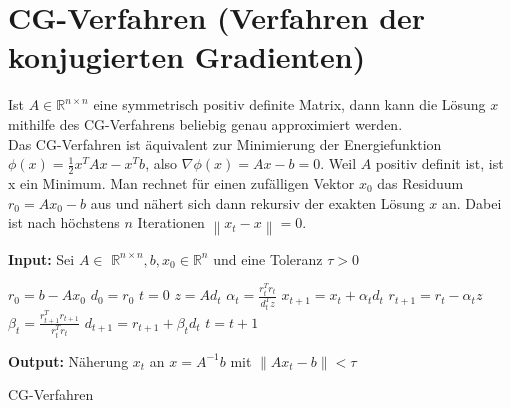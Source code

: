 \documentclass[12pt,a4paper]{scrartcl}
\numberwithin{equation}{section}
\numberwithin{myalgctr}{section}
\numberwithin{mytheoremctr}{subsection}
\numberwithin{mykorollarctr}{subsection}
\numberwithin{mylemmactr}{subsection}
\numberwithin{mybeispielctr}{subsection}
\newcommand\norm[1]{\left\lVert#1\right\rVert}
\begin{document}
	\newpage
	\section{CG-Verfahren (Verfahren der konjugierten Gradienten)}
	
	Ist  $A\in\mathbb{R}^{n\times n}$ eine symmetrisch positiv definite Matrix, dann kann die Lösung $x$ mithilfe des CG-Verfahrens beliebig genau approximiert werden.\\
	Das CG-Verfahren ist äquivalent zur Minimierung der Energiefunktion $\phi(x) = \frac{1}{2}x^{T}Ax - x^{T}b$, also $\nabla\phi(x) = Ax - b = 0$. Weil $A$ positiv definit ist, ist x ein Minimum. Man rechnet für einen zufälligen Vektor $x_0$ das Residuum $r_0 = Ax_0 - b$ aus und nähert sich dann rekursiv der exakten Lösung $x$ an. Dabei ist nach höchstens $n$ Iterationen $\norm{x_t - x} = 0$.
	
	\begin{algorithm}[H]
		\textbf{Input:} Sei $A\in$ $\mathbb{R}^{n\times n}, b, x_0 \in \mathbb{R}^{n}$ und eine Toleranz $\tau > 0$
		\begin{algorithmic}[1]
			\State $r_0 = b - Ax_0$
			\State $d_0 = r_0$
			\State $t = 0$
			\While{$ \norm{r_t} > \tau $}
			\State $z = Ad_t$
			\State $\alpha_t = \frac{r_t^{T}r_t}{d_t^{T}z}$
			\State $x_{t+1} = x_{t} + \alpha_t d_t$
			\State $r_{t+1} = r_t - \alpha_t z$
			\State $\beta_t = \frac{r_{t+1}^{T}r_{t+1}}{r_t^{T}r_t}$
			\State $d_{t+1} = r_{t+1} + \beta_td_t$
			\State $t = t + 1$
			\EndWhile
		\end{algorithmic}
		\textbf{Output:} Näherung $x_t$ an $x = A^{-1}b$ mit $\norm{Ax_t-b} < \tau$
		
		\caption{CG-Verfahren} \label{alg:cg}
	\end{algorithm}
	
\end{document}
